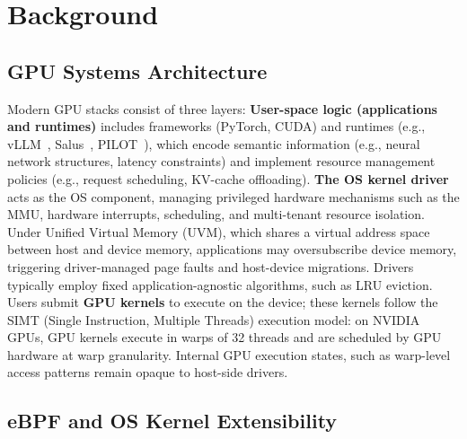 \section{Background}
\subsection{GPU Systems Architecture}
\label{sec:arch-gpu}

Modern GPU stacks consist of three layers:
\textbf{User-space logic (applications and runtimes)} includes frameworks (PyTorch, CUDA) and runtimes (e.g., vLLM~\cite{kwon2023efficient}, Salus~\cite{yu2020fine}, PILOT~\cite{ravi2021pilot}), which encode semantic information (e.g., neural network structures, latency constraints) and implement resource management policies (e.g., request scheduling, KV-cache offloading).
\textbf{The OS kernel driver} acts as the OS component, managing privileged hardware mechanisms such as the MMU, hardware interrupts, scheduling, and multi-tenant resource isolation. Under Unified Virtual Memory (UVM), which shares a virtual address space between host and device memory, applications may oversubscribe device memory, triggering driver-managed page faults and host-device migrations. Drivers typically employ fixed application-agnostic algorithms, such as LRU eviction.
Users submit \textbf{GPU kernels} to execute on the device; these kernels follow the SIMT (Single Instruction, Multiple Threads) execution model: on NVIDIA GPUs, GPU kernels execute in warps of 32 threads and are scheduled by GPU hardware at warp granularity. Internal GPU execution states, such as warp-level access patterns remain opaque to host-side drivers.

\subsection{eBPF and OS Kernel Extensibility}
\label{sec:background}

